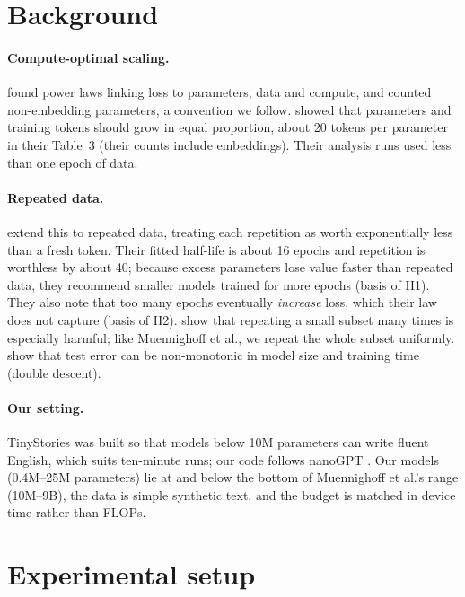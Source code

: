 \documentclass[11pt]{article}
\begin{document}
\section{Background}
\paragraph{Compute-optimal scaling.}
\citet{kaplan2020scaling} found power laws linking loss to parameters, data and compute, and counted
non-embedding parameters, a convention we follow. \citet{hoffmann2022chinchilla} showed that parameters and
training tokens should grow in equal proportion, about 20 tokens per parameter in their Table~3 (their counts
include embeddings). Their analysis runs used less than one epoch of data.

\paragraph{Repeated data.}
\citet{muennighoff2023scaling} extend this to repeated data, treating each repetition as worth exponentially
less than a fresh token. Their fitted half-life is about 16 epochs and repetition is worthless by about 40;
because excess parameters lose value faster than repeated data, they recommend smaller models trained for more
epochs (basis of H1). They also note that too many epochs eventually \emph{increase} loss, which their law does
not capture (basis of H2). \citet{hernandez2022repeated} show that repeating a small subset many times is
especially harmful; like Muennighoff et al., we repeat the whole subset uniformly. \citet{nakkiran2021deep}
show that test error can be non-monotonic in model size and training time (double descent).

\paragraph{Our setting.}
TinyStories \citep{eldan2023tinystories} was built so that models below 10M parameters can write fluent
English, which suits ten-minute runs; our code follows nanoGPT \citep{karpathy2022nanogpt}. Our models 
(0.4M--25M parameters) lie at and below the bottom of Muennighoff et al.'s range (10M--9B), the data is 
simple synthetic text, and the budget is matched in device time rather than FLOPs.

\section{Experimental setup}\label{sec:setup}
\end{document}
